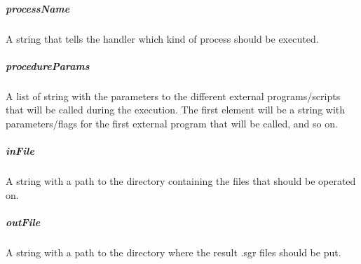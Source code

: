 \subparagraph*{processName} A string that tells the handler which kind of process should be executed.
\subparagraph*{procedureParams} A list of string with the parameters to the different external  programs/scripts that will be called during the execution. The first element will be a string with parameters/flags for the first external program that will be called, and so on.
\subparagraph*{inFile} A string with a path to the directory containing the files that should be operated on.
\subparagraph*{outFile} A string with a path to the directory where the result .sgr files should be put.




